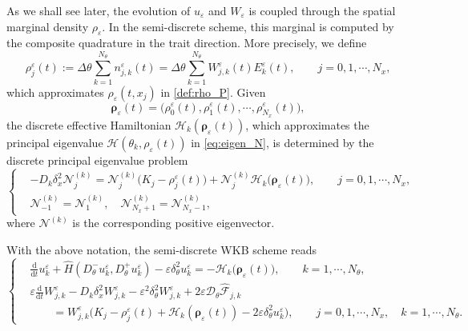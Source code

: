 \documentclass[11pt]{article}
\begin{document}
As we shall see later, the evolution of \(u_\varepsilon\) and
\(W_\varepsilon\) is coupled through the spatial marginal density $\rho_\varepsilon$.  In the
semi-discrete scheme, this marginal is computed by the composite quadrature in
the trait direction.  More precisely, we define
\begin{equation}\label{eq:E_rho}
\rho_{j}^\varepsilon(t)
:=
\Delta\theta
\sum_{k=1}^{N_\theta}
n_{j,k}^\varepsilon(t)
=
\Delta\theta
\sum_{k=1}^{N_\theta}
W_{j,k}^\varepsilon(t)E_k^\varepsilon(t),
\qquad
j=0, 1,\cdots, N_x, 
\end{equation}
which approximates $\rho_{\varepsilon}(t, x_j)$ in \eqref{def:rho_P}. 
Given
\[
\boldsymbol\rho_\varepsilon(t)
=
\bigl(\rho_{0}^\varepsilon(t), \rho_{1}^\varepsilon(t),\cdots,\rho_{N_x}^\varepsilon(t)\bigr),
\]
the discrete effective Hamiltonian
\(\mathcal H_k(\boldsymbol\rho_\varepsilon(t))\), which approximates the principal eigenvalue $\mathcal H(\theta_k, \rho_\varepsilon(t))$ in \eqref{eq:eigen_N}, is determined by the discrete
principal eigenvalue problem
\begin{equation}\label{eq:eigen_discrete}
\left\{
\begin{aligned}
&-D_k\delta_x^2\mathcal N_j^{(k)}
=
\mathcal N_j^{(k)}
\bigl(K_j-\rho_{j}^\varepsilon(t)\bigr)
+
\mathcal N_j^{(k)}
\mathcal H_k\bigl(\boldsymbol\rho_\varepsilon(t)\bigr),
\qquad
j=0, 1,\cdots,N_x, \\
& \mathcal N_{-1}^{(k)} = \mathcal N_{1}^{(k)}, \quad \mathcal N_{N_x+1}^{(k)} = \mathcal N_{N_x-1}^{(k)}, 
\end{aligned}
\right.
\end{equation}
where \(\mathcal N^{(k)}\) is the corresponding positive eigenvector. 

With the above notation, the semi-discrete WKB scheme reads
\begin{equation}\label{eq:semi_discrete_WKB_system}
\left\{
\begin{aligned}
&\frac{\mathrm d}{\mathrm dt}u_k^\varepsilon
+
\widehat H
\left(
D_\theta^-u_k^\varepsilon,
D_\theta^+u_k^\varepsilon
\right)
-
\varepsilon\delta_\theta^2u_k^\varepsilon
=
-\mathcal H_k\bigl(\boldsymbol\rho_\varepsilon(t)\bigr),
\qquad
k=1,\cdots,N_\theta,
\\[1mm]
&\varepsilon
\frac{\mathrm d}{\mathrm dt}W_{j,k}^\varepsilon
-
D_k\delta_x^2W_{j,k}^\varepsilon
-
\varepsilon^2\delta_\theta^2W_{j,k}^\varepsilon
+
2\varepsilon
\mathcal D_\theta
\widehat{\mathcal F}_{j,k}
\\
&\qquad =
W_{j,k}^\varepsilon
\bigl(
K_j-\rho_{j}^\varepsilon(t)
+\mathcal H_k(\boldsymbol\rho_\varepsilon(t))
-2\varepsilon\delta_\theta^2u_k^\varepsilon
\bigr),
\qquad
j=0, 1,\cdots,N_x,\quad k=1,\cdots,  N_\theta.
\end{aligned}
\right.
\end{equation}
\end{document}
